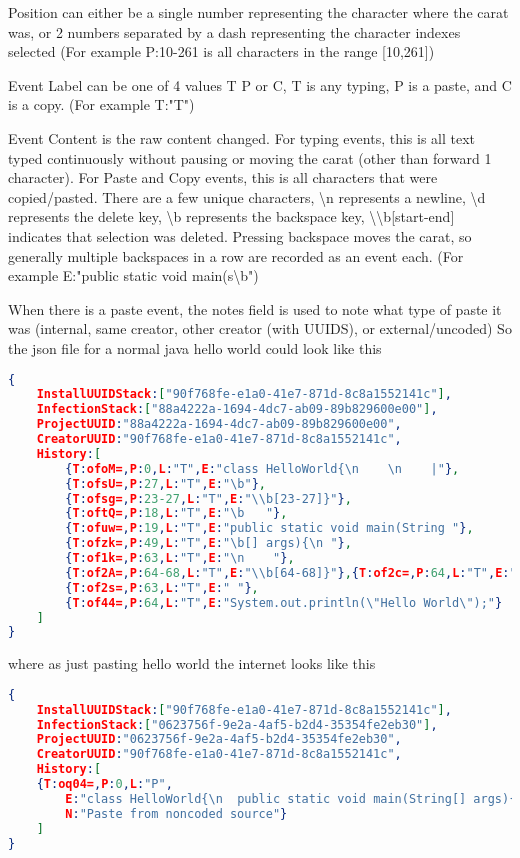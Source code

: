 \documentclass[conference]{IEEEtran}
\newcommand{\n}{\hfill\break}
\begin{document}
Position can either be a single number representing the character where the carat was, or 2 numbers separated by a dash representing the character indexes selected (For example P:10-261 is all characters in the range [10,261])

Event Label can be one of 4 values T P or C, T is any typing, P is a paste, and C is a copy. (For example T:"T")

Event Content is the raw content changed.  For typing events, this is all text typed continuously without pausing or moving the carat (other than forward 1 character).  For Paste and Copy events, this is all characters that were copied/pasted.  There are a few unique characters, \textbackslash{}n represents a newline, \textbackslash{}d represents the delete key, \textbackslash{}b represents the backspace key, \textbackslash{}\textbackslash{}b[start-end] indicates that selection was deleted.  Pressing backspace moves the carat, so generally multiple backspaces in a row are recorded as an event each.    (For example E:"public static void main(s\textbackslash{}b")

When there is a paste event, the notes field is used to note what type of paste it was (internal, same creator, other creator (with UUIDS), or external/uncoded)
So the json file for a normal java hello world could look like this 
\begin{lstlisting}[language=json]
{
	InstallUUIDStack:["90f768fe-e1a0-41e7-871d-8c8a1552141c"],
	InfectionStack:["88a4222a-1694-4dc7-ab09-89b829600e00"],
	ProjectUUID:"88a4222a-1694-4dc7-ab09-89b829600e00",
	CreatorUUID:"90f768fe-e1a0-41e7-871d-8c8a1552141c",
	History:[
		{T:ofoM=,P:0,L:"T",E:"class HelloWorld{\n    \n    |"},
		{T:ofsU=,P:27,L:"T",E:"\b"},
		{T:ofsg=,P:23-27,L:"T",E:"\\b[23-27]}"},
		{T:oftQ=,P:18,L:"T",E:"\b	"},
		{T:ofuw=,P:19,L:"T",E:"public static void main(String "},
		{T:ofzk=,P:49,L:"T",E:"\b[] args){\n "},
		{T:of1k=,P:63,L:"T",E:"\n    "},
		{T:of2A=,P:64-68,L:"T",E:"\\b[64-68]}"},{T:of2c=,P:64,L:"T",E:"	"},
		{T:of2s=,P:63,L:"T",E:"	"},
		{T:of44=,P:64,L:"T",E:"System.out.println(\"Hello World\");"}
	]
}
\end{lstlisting}
where as just pasting hello world the internet looks like this
\begin{lstlisting}[language=json]
{
	InstallUUIDStack:["90f768fe-e1a0-41e7-871d-8c8a1552141c"],
	InfectionStack:["0623756f-9e2a-4af5-b2d4-35354fe2eb30"],
	ProjectUUID:"0623756f-9e2a-4af5-b2d4-35354fe2eb30",
	CreatorUUID:"90f768fe-e1a0-41e7-871d-8c8a1552141c",
	History:[
	{T:oq04=,P:0,L:"P",
		E:"class HelloWorld{\n	public static void main(String[] args){\n    	System.out.println(\"Hello World\");\n	}\n}",
		N:"Paste from noncoded source"}
	]
}
\end{lstlisting}
\end{document}
